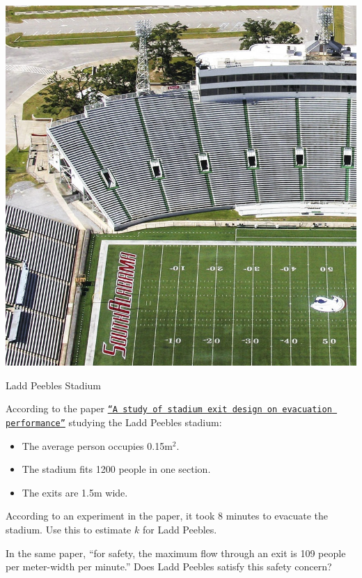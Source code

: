 \begin{slide}

\question

\begin{center}
	\includegraphics[width=.4\textwidth]{images/Ladd_Stadium-cropped.jpg}
	
	Ladd Peebles Stadium
\end{center}

\begin{slidesonly}
	\bigskip
\end{slidesonly}

According to the paper \href{https://www.researchgate.net/publication/289492130_A_study_of_stadium_exit_design_on_evacuation_performance}{\tt ``A study of stadium exit design on evacuation performance''} studying the Ladd Peebles stadium:
\begin{itemize}
	\item The average person occupies 0.15m$^2$.
	\item The stadium fits 1200 people in one section.
	\item The exits are 1.5m wide.
\end{itemize}


\begin{parts}
	\item According to an experiment in the paper, it took 8 minutes to evacuate the stadium. Use this to estimate $k$ for Ladd Peebles.
	
	\item In the same paper, ``for safety, the maximum flow through an exit is 109 people per meter-width per minute.'' Does Ladd Peebles satisfy this safety concern?

\end{parts}

\end{slide}

